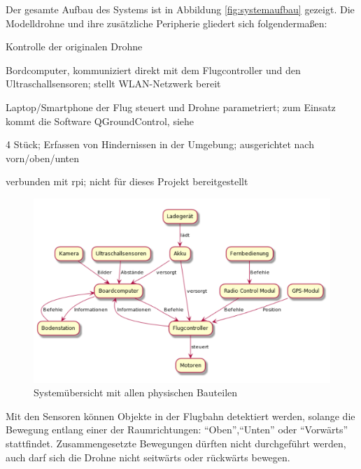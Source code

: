 Der gesamte Aufbau des Systems ist in Abbildung \ref{fig:systemaufbau} gezeigt. Die Modelldrohne und ihre zusätzliche Peripherie gliedert sich folgendermaßen:
\begin{compactdesc}
    \item[Flugcontroller:] Kontrolle der originalen Drohne
    \item[\gls{rpi}:] Bordcomputer, kommuniziert direkt mit dem Flugcontroller und den Ultraschallsensoren; stellt WLAN-Netzwerk bereit
	\item[\gls{gcs}\footnote{Bodenstation}:] Laptop/Smartphone der Flug steuert und Drohne parametriert; zum Einsatz kommt die Software QGroundControl, siehe \cite[Kapitel 4.3.5]{wirthErweiterungBestehendenDrohne2022}
    \item[Ultraschallsensoren:] 4 Stück; Erfassen von Hindernissen in der Umgebung; ausgerichtet nach vorn/oben/unten
    \item[Kamera:] verbunden mit \gls{rpi}; nicht für dieses Projekt bereitgestellt
\end{compactdesc}

\begin{figure}[!h]
	\includegraphics[width=\linewidth]{images/systemuebersicht.png}
	\caption{Systemübersicht mit allen physischen Bauteilen\cite[Kapitel 4.3]{wirthErweiterungBestehendenDrohne2022}}
	\label{fig:setup_initial}
	\end{figure}

Mit den Sensoren können Objekte in der Flugbahn detektiert werden, solange die Bewegung entlang einer der Raumrichtungen: \enquote{Oben},\enquote{Unten} oder \enquote{Vorwärts} stattfindet. Zusammengesetzte Bewegungen dürften nicht durchgeführt werden, auch darf sich die Drohne nicht seitwärts oder rückwärts bewegen.

